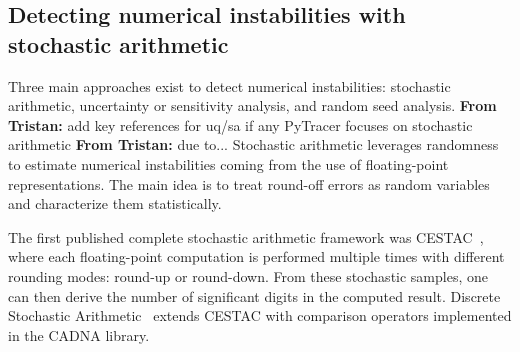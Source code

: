 \documentclass[11pt]{article}
\newcommand{\tristan}[1]{\color{orange}\textbf{From Tristan:} #1\color{black}\xspace}
\newcommand{\pytracer}[0]{PyTracer\xspace}
\begin{document}
\label{sec:detecting-instabilities}
\subsection{Detecting numerical instabilities with stochastic arithmetic}
\label{sec:mca}

 




Three main approaches exist to detect numerical instabilities: stochastic arithmetic, uncertainty or sensitivity analysis, and random seed analysis. \tristan{add key references for uq/sa if any} \pytracer focuses on stochastic arithmetic \tristan{due to...}
Stochastic arithmetic leverages randomness to estimate numerical instabilities coming from the use of floating-point representations. The main idea is to treat round-off errors 
as random variables and characterize them statistically.

The first published complete stochastic arithmetic framework was CESTAC~\cite{vignes1993stochastic}, where each floating-point computation is performed multiple times with different rounding modes: round-up or round-down. From these stochastic samples, one can then derive the number of significant digits in the computed result. Discrete Stochastic Arithmetic~\cite{vignes2004discrete} extends CESTAC with comparison operators implemented in the CADNA library.
\end{document}
